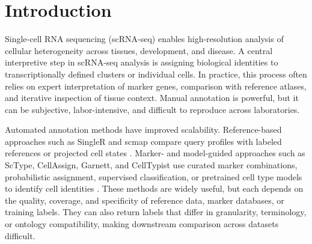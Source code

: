 \documentclass[referee,lineno,pdflatex]{sn-jnl}
\begin{document}

\maketitle

\section{Introduction}\label{sec:introduction}

Single-cell RNA sequencing (scRNA-seq) enables high-resolution analysis of cellular heterogeneity across tissues, development, and disease. A central interpretive step in scRNA-seq analysis is assigning biological identities to transcriptionally defined clusters or individual cells. In practice, this process often relies on expert interpretation of marker genes, comparison with reference atlases, and iterative inspection of tissue context. Manual annotation is powerful, but it can be subjective, labor-intensive, and difficult to reproduce across laboratories.

Automated annotation methods have improved scalability. Reference-based approaches such as SingleR and scmap compare query profiles with labeled references or projected cell states \cite{aran2019singler,singlerbook,kiselev2018scmap}. Marker- and model-guided approaches such as ScType, CellAssign, Garnett, and CellTypist use curated marker combinations, probabilistic assignment, supervised classification, or pretrained cell type models to identify cell identities \cite{ianevski2022sctype,zhang2019cellassign,pliner2019garnett,dominguezconde2022celltypist}. These methods are widely useful, but each depends on the quality, coverage, and specificity of reference data, marker databases, or training labels. They can also return labels that differ in granularity, terminology, or ontology compatibility, making downstream comparison across datasets difficult.
\end{document}
